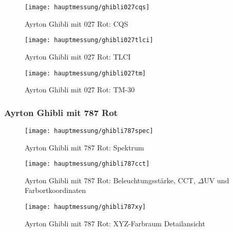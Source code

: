 \documentclass[pagesize,paper=A4,fontsize=12pt,utf8,numbers=noenddot,bibliography=totoc,listof=totoc,DIV=11,BCOR=1mm]{scrreprt}
\begin{document}
\begin{figure}[htp]     %
\centering
\texttt{[image: hauptmessung/ghibli027cqs]} 
\caption {Ayrton Ghibli mit 027 Rot: CQS} 
\end{figure}

\begin{figure}[htp]     %
\centering
\texttt{[image: hauptmessung/ghibli027tlci]} 
\caption {Ayrton Ghibli mit 027 Rot: TLCI} 
\end{figure}

\begin{figure}[htp]     %
\centering
\texttt{[image: hauptmessung/ghibli027tm]} 
\caption {Ayrton Ghibli mit 027 Rot: TM-30} 
\end{figure}

\subsubsection{Ayrton Ghibli mit 787 Rot}

\begin{figure}[htp]     %
\centering
\texttt{[image: hauptmessung/ghibli787spec]} 
\caption {Ayrton Ghibli mit 787 Rot: Spektrum} 
\end{figure}

\begin{figure}[htp]     %
\centering
\texttt{[image: hauptmessung/ghibli787cct]} 
\caption {Ayrton Ghibli mit 787 Rot: Beleuchtungsstärke, CCT, $\Delta$UV und Farbortkoordinaten} 
\end{figure}

\begin{figure}[htp]     %
\centering
\texttt{[image: hauptmessung/ghibli787xy]} 
\caption {Ayrton Ghibli mit 787 Rot: XYZ-Farbraum Detailansicht} 
\end{figure}
\end{document}
